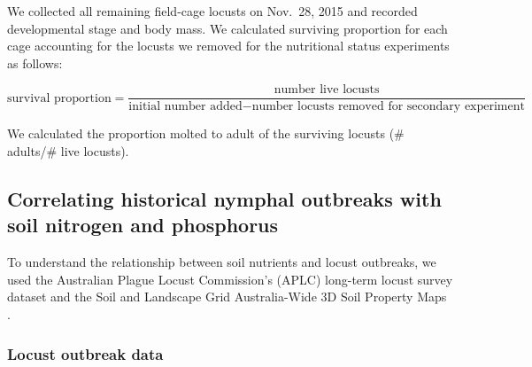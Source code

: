 \documentclass[
]{article}
\begin{document}
We collected all remaining field-cage locusts on Nov.~28, 2015 and
recorded developmental stage and body mass. We calculated surviving
proportion for each cage accounting for the locusts we removed for the
nutritional status experiments as follows:

\[
\text{survival proportion} = \frac{\text{number live locusts}}{\text{initial number added} - \text{number locusts removed for secondary experiment}}
\]

We calculated the proportion molted to adult of the surviving locusts
(\# adults/\# live locusts).

\subsection{Correlating historical nymphal outbreaks with soil nitrogen
and
phosphorus}\label{correlating-historical-nymphal-outbreaks-with-soil-nitrogen-and-phosphorus}

To understand the relationship between soil nutrients and locust
outbreaks, we used the Australian Plague Locust Commission's (APLC)
long-term locust survey dataset \citep{deveson_operation_2002} and the
Soil and Landscape Grid Australia-Wide 3D Soil Property Maps
\citep{grundy_soil_2015}.

\subsubsection{Locust outbreak data}\label{locust-outbreak-data}
\end{document}
